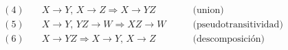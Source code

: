 \documentclass[preview]{standalone}
\begin{document}
\begin{align*}
(4) & \quad  X\rightarrow Y\text{, }  X\rightarrow Z   \Rightarrow X\rightarrow YZ  &\quad\quad  \text{(union)}\\
(5) & \quad  X\rightarrow Y\text{, }  YZ\rightarrow W   \Rightarrow XZ\rightarrow W  &\quad\quad  \text{(pseudotransitividad)}\\
(6) & \quad  X\rightarrow YZ \Rightarrow X\rightarrow Y \text{, }  X\rightarrow Z   &\quad\quad  \text{(descomposici\'on)}\\
\end{align*}
\end{document}
